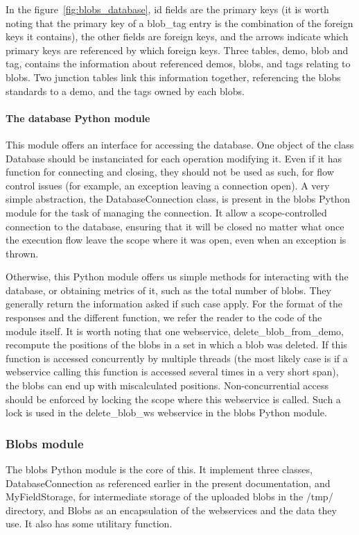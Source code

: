 In the figure~\ref{fig:blobs_database}, id fields are the primary keys (it is worth noting that the primary key of a blob\_tag entry is the combination of the foreign keys it contains), the other fields are foreign keys, and the arrows indicate which primary keys are referenced by which foreign keys.
Three tables, demo, blob and tag, contains the information about referenced demos, blobs, and tags relating to blobs. Two junction tables link this information together, referencing the blobs standards to a demo, and the tags owned by each blobs.

\paragraph{The database Python module\\}
This module offers an interface for accessing the database. One object of the class Database should be instanciated for each operation modifying it. Even if it has function for connecting and closing, they should not be used as such, for flow control issues (for example, an exception leaving a connection open). A very simple abstraction, the DatabaseConnection class, is present in the blobs Python module for the task of managing the connection. It allow a scope-controlled connection to the database, ensuring that it will be closed no matter what once the execution flow leave the scope where it was open, even when an exception is thrown.

Otherwise, this Python module offers us simple methods for interacting with the database, or obtaining metrics of it, such as the total number of blobs. They generally return the information asked if such case apply. For the format of the responses and the different function, we refer the reader to the code of the module itself. It is worth noting that one webservice, delete\_blob\_from\_demo, recompute the positions of the blobs in a set in which a blob was deleted. If this function is accessed concurrently by multiple threads (the most likely case is if a webservice calling this function is accessed several times in a very short span), the blobs can end up with miscalculated positions. Non-concurrential access should be enforced by locking the scope where this webservice is called. Such a lock is used in the delete\_blob\_ws webservice in the blobs Python module.

\subsubsection{Blobs module}
The blobs Python module is the core of this. It implement three classes, DatabaseConnection as referenced earlier in the present documentation, and MyFieldStorage, for intermediate storage of the uploaded blobs in the /tmp/ directory, and Blobs as an encapsulation of the webservices and the data they use. It also has some utilitary function.

